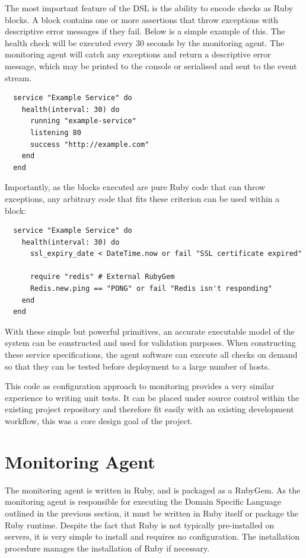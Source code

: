 \documentclass{cshonours}
\begin{document}
The most important feature of the DSL is the ability to encode checks as Ruby blocks. A block contains one or more assertions that throw exceptions with descriptive error messages if they fail. Below is a simple example of this. The health check will be executed every 30 seconds by the monitoring agent. The monitoring agent will catch any exceptions and return a descriptive error message, which may be printed to the console or serialised and sent to the event stream.

\begin{verbatim}
  service "Example Service" do
    health(interval: 30) do
      running "example-service"
      listening 80
      success "http://example.com"
    end
  end
\end{verbatim}

Importantly, as the blocks executed are pure Ruby code that can throw exceptions, any arbitrary code that fits these criterion can be used within a block:

\begin{verbatim}
  service "Example Service" do
    health(interval: 30) do
      ssl_expiry_date < DateTime.now or fail "SSL certificate expired"

      require "redis" # External RubyGem
      Redis.new.ping == "PONG" or fail "Redis isn't responding"
    end
  end
\end{verbatim}

With these simple but powerful primitives, an accurate executable model of the system can be constructed and used for validation purposes. When constructing these service specifications, the agent software can execute all checks on demand so that they can be tested before deployment to a large number of hosts.

This code as configuration approach to monitoring provides a very similar experience to writing unit tests. It can be placed under source control within the existing project repository and therefore fit easily with an existing development workflow, this was a core design goal of the project.

\section{Monitoring Agent}

The monitoring agent is written in Ruby, and is packaged as a RubyGem. As the monitoring agent is responsible for executing the Domain Specific Language outlined in the previous section, it must be written in Ruby itself or package the Ruby runtime. Despite the fact that Ruby is not typically pre-installed on servers, it is very simple to install and requires no configuration. The installation procedure manages the installation of Ruby if necessary.
\end{document}
